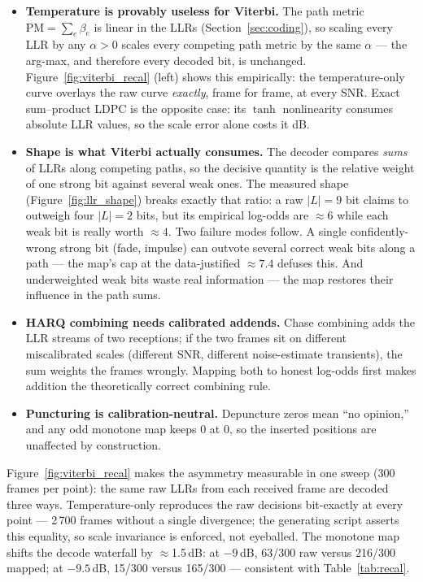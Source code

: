 \begin{itemize}
    \item \textbf{Temperature is provably useless for Viterbi.}  The
          path metric $\mathrm{PM} = \sum_e \beta_e$ is linear in the
          LLRs (Section~\ref{sec:coding}), so scaling every LLR by any
          $\alpha > 0$ scales every competing path metric by the same
          $\alpha$ --- the arg-max, and therefore every decoded bit,
          is unchanged.  Figure~\ref{fig:viterbi_recal} (left) shows
          this empirically: the temperature-only curve overlays the
          raw curve \emph{exactly}, frame for frame, at every SNR.
          Exact sum--product LDPC is the opposite case: its $\tanh$
          nonlinearity consumes absolute LLR values, so the scale
          error alone costs it dB.
    \item \textbf{Shape is what Viterbi actually consumes.}  The
          decoder compares \emph{sums} of LLRs along competing paths,
          so the decisive quantity is the relative weight of one
          strong bit against several weak ones.  The measured shape
          (Figure~\ref{fig:llr_shape}) breaks exactly that ratio: a
          raw $|L|=9$ bit claims to outweigh four $|L|=2$ bits, but
          its empirical log-odds are $\approx 6$ while each weak bit
          is really worth $\approx 4$.  Two failure modes follow.  A
          single confidently-wrong strong bit (fade, impulse) can
          outvote several correct weak bits along a path --- the
          map's cap at the data-justified $\approx 7.4$ defuses this.
          And underweighted weak bits waste real information --- the
          map restores their influence in the path sums.
    \item \textbf{HARQ combining needs calibrated addends.}  Chase
          combining adds the LLR streams of two receptions; if the
          two frames sit on different miscalibrated scales (different
          SNR, different noise-estimate transients), the sum weights
          the frames wrongly.  Mapping both to honest log-odds first
          makes addition the theoretically correct combining rule.
    \item \textbf{Puncturing is calibration-neutral.}  Depuncture
          zeros mean ``no opinion,'' and any odd monotone map keeps
          $0$ at $0$, so the inserted positions are unaffected by
          construction.
\end{itemize}

Figure~\ref{fig:viterbi_recal} makes the asymmetry measurable in one
sweep (300 frames per point): the same raw LLRs from each received
frame are decoded three ways.  Temperature-only reproduces the raw
decisions bit-exactly at every point --- 2\,700 frames without a
single divergence; the generating script asserts this equality, so
scale invariance is enforced, not eyeballed.  The monotone map shifts
the decode waterfall by $\approx$1.5\,dB: at $-9$\,dB, 63/300 raw
versus 216/300 mapped; at $-9.5$\,dB, 15/300 versus 165/300 ---
consistent with Table~\ref{tab:recal}.

